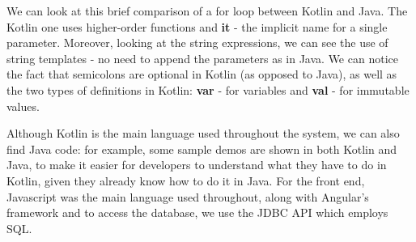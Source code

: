 \documentclass[12pt,twoside]{article}
\begin{document}
We can look at this brief comparison of a for loop between Kotlin and Java. The Kotlin one uses higher-order functions and \textbf{it} - the implicit name for a single parameter. Moreover, looking at the string expressions, we can see the use of string templates - no need to append the parameters as in Java. We can notice the fact that semicolons are optional in Kotlin (as opposed to Java), as well as the two types of definitions in Kotlin: \textbf{var} - for variables and \textbf{val} - for immutable values. 



Although Kotlin is the main language used throughout the system, we can also find Java code: for example, some sample demos are shown in both Kotlin and Java, to make it easier for developers to understand what they have to do in Kotlin, given they already know how to do it in Java. For the front end, Javascript was the main language used throughout, along with Angular's framework and to access the database, we use the JDBC API which employs SQL.
\newpage
\end{document}
